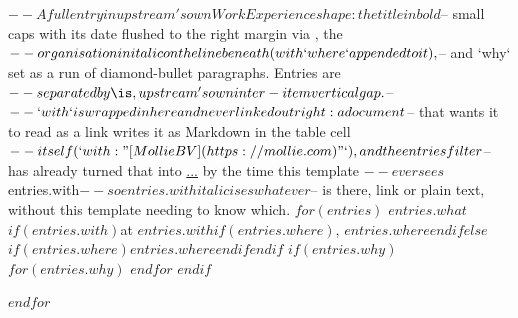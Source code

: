 $-- A full entry in upstream's own Work Experience shape: the title in bold
$-- small caps with its date flushed to the right margin via \dates{}, the
$-- organisation in italic on the line beneath (with `where` appended to it),
$-- and `why` set as a run of \smaller diamond-bullet paragraphs. Entries are
$-- separated by \is, upstream's own inter-item vertical gap.
$--
$-- `with` is wrapped in \textit{} here and never linked outright: a document
$-- that wants it to read as a link writes it as Markdown in the table cell
$-- itself (`with: "[Mollie BV](https://mollie.com)"`), and the entries filter
$-- has already turned that into \href{...}{...} by the time this template
$-- ever sees $entries.with$ -- so \textit{$entries.with$} italicises whatever
$-- is there, link or plain text, without this template needing to know which.
$for(entries)$
\textbf{\textsc{$entries.what$}}\\
$if(entries.with)$at \textit{$entries.with$}$if(entries.where)$, $entries.where$$endif$$else$$if(entries.where)$$entries.where$$endif$$endif$
$if(entries.why)$
$for(entries.why)$
$endfor$
$endif$
\is

$endfor$
